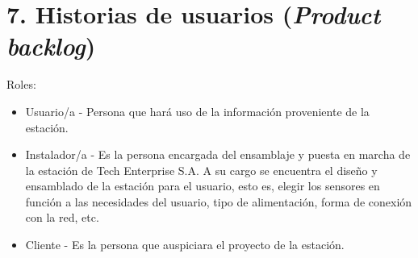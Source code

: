 \documentclass[
11pt, %
]{charter}
\begin{document}
\section{7. Historias de usuarios (\textit{Product backlog})}
\label{sec:backlog}

Roles: 
\begin{itemize}
	\item Usuario/a - Persona que hará uso de la información proveniente de la estación.
	\item Instalador/a - Es la persona encargada del ensamblaje y puesta en marcha de la estación de Tech Enterprise S.A. A su cargo se encuentra el diseño y ensamblado de la estación para el usuario, esto es, elegir los sensores en función a las necesidades del usuario, tipo de alimentación, forma de conexión con la red, etc.   
	\item Cliente - Es la persona que auspiciara el proyecto de la estación.
\end{itemize}
\end{document}
